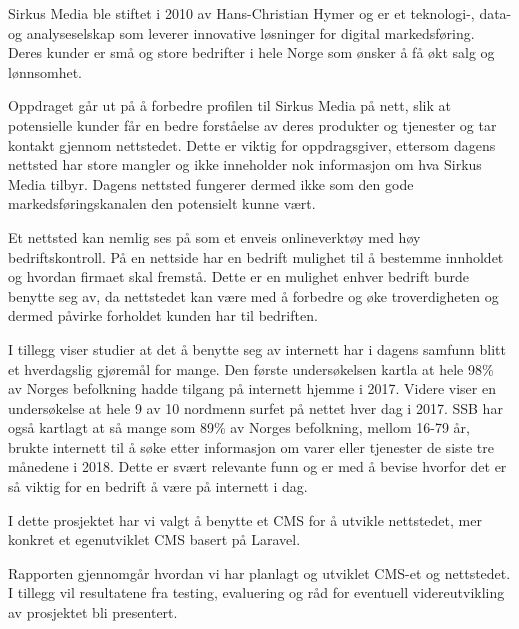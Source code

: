 Sirkus Media ble stiftet i 2010 av Hans-Christian Hymer og er et teknologi-, data- og analyseselskap som leverer innovative løsninger for digital markedsføring. Deres kunder er små og store bedrifter i hele Norge som ønsker å få økt salg og lønnsomhet. 

Oppdraget går ut på å forbedre profilen til Sirkus Media på nett, slik at potensielle kunder får en bedre forståelse av deres produkter og tjenester og tar kontakt gjennom nettstedet. Dette er viktig for oppdragsgiver, ettersom dagens nettsted har store mangler og ikke inneholder nok informasjon om hva Sirkus Media tilbyr. Dagens nettsted fungerer dermed ikke som den gode markedsføringskanalen den potensielt kunne vært. 

Et nettsted kan nemlig ses på som et enveis onlineverktøy med høy bedriftskontroll. På en nettside har en bedrift mulighet til å bestemme innholdet og hvordan firmaet skal fremstå. Dette er en mulighet enhver bedrift burde benytte seg av, da nettstedet kan være med å forbedre og øke troverdigheten og dermed påvirke forholdet kunden har til bedriften.

I tillegg viser studier at det å benytte seg av internett har i dagens samfunn blitt et hverdagslig gjøremål for mange. Den første undersøkelsen kartla at hele 98\% av Norges befolkning hadde tilgang på internett hjemme i 2017. Videre viser en undersøkelse at hele 9 av 10 nordmenn surfet på nettet hver dag i 2017. SSB har også kartlagt  at så mange som 89\% av Norges befolkning, mellom 16-79 år, brukte internett til å søke etter informasjon om varer eller tjenester de siste tre månedene i 2018. Dette er svært relevante funn og er med å bevise hvorfor det er så viktig for en bedrift å være på internett i dag.

I dette prosjektet har vi valgt å benytte et CMS for å utvikle nettstedet, mer konkret et egenutviklet CMS basert på Laravel.

Rapporten gjennomgår hvordan vi har planlagt og utviklet CMS-et og nettstedet. I tillegg vil resultatene fra testing, evaluering og råd for eventuell videreutvikling av prosjektet bli presentert.